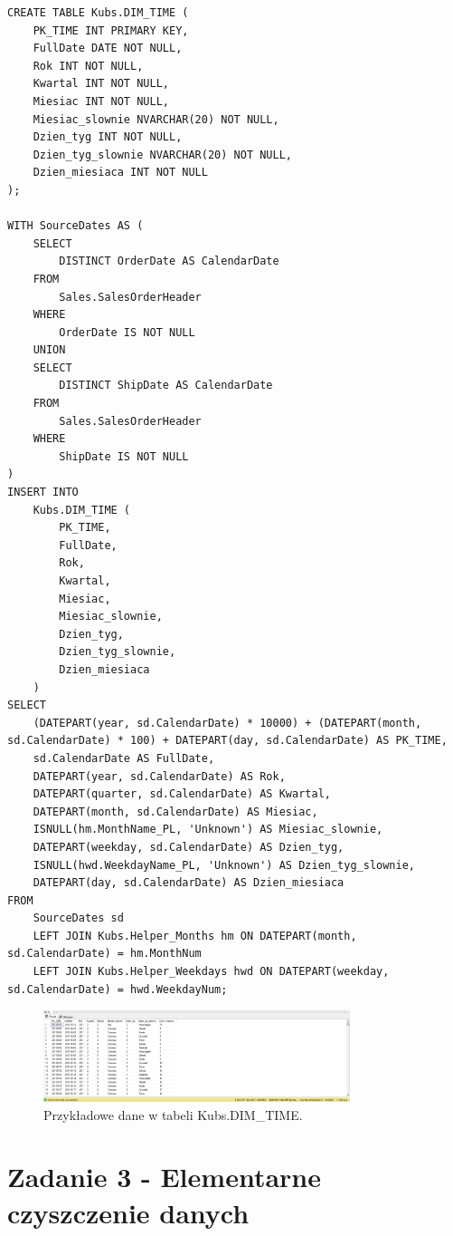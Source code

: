 \documentclass[a4paper,12pt]{article}
\begin{document}
\begin{lstlisting}[caption={Tworzenie i wypełnianie tabeli DIM\_TIME.}, label=lst:zad2_dim_time]
CREATE TABLE Kubs.DIM_TIME (
    PK_TIME INT PRIMARY KEY,
    FullDate DATE NOT NULL,
    Rok INT NOT NULL,
    Kwartal INT NOT NULL,
    Miesiac INT NOT NULL,
    Miesiac_slownie NVARCHAR(20) NOT NULL,
    Dzien_tyg INT NOT NULL,
    Dzien_tyg_slownie NVARCHAR(20) NOT NULL,
    Dzien_miesiaca INT NOT NULL
);

WITH SourceDates AS (
    SELECT
        DISTINCT OrderDate AS CalendarDate
    FROM
        Sales.SalesOrderHeader
    WHERE
        OrderDate IS NOT NULL
    UNION
    SELECT
        DISTINCT ShipDate AS CalendarDate
    FROM
        Sales.SalesOrderHeader
    WHERE
        ShipDate IS NOT NULL
)
INSERT INTO
    Kubs.DIM_TIME (
        PK_TIME,
        FullDate,
        Rok,
        Kwartal,
        Miesiac,
        Miesiac_slownie,
        Dzien_tyg,
        Dzien_tyg_slownie,
        Dzien_miesiaca
    )
SELECT
    (DATEPART(year, sd.CalendarDate) * 10000) + (DATEPART(month, sd.CalendarDate) * 100) + DATEPART(day, sd.CalendarDate) AS PK_TIME,
    sd.CalendarDate AS FullDate,
    DATEPART(year, sd.CalendarDate) AS Rok,
    DATEPART(quarter, sd.CalendarDate) AS Kwartal,
    DATEPART(month, sd.CalendarDate) AS Miesiac,
    ISNULL(hm.MonthName_PL, 'Unknown') AS Miesiac_slownie,
    DATEPART(weekday, sd.CalendarDate) AS Dzien_tyg,
    ISNULL(hwd.WeekdayName_PL, 'Unknown') AS Dzien_tyg_slownie,
    DATEPART(day, sd.CalendarDate) AS Dzien_miesiaca
FROM
    SourceDates sd
    LEFT JOIN Kubs.Helper_Months hm ON DATEPART(month, sd.CalendarDate) = hm.MonthNum
    LEFT JOIN Kubs.Helper_Weekdays hwd ON DATEPART(weekday, sd.CalendarDate) = hwd.WeekdayNum;
\end{lstlisting}

\begin{figure}[H]
    \centering
    \includegraphics[width=0.8\textwidth]{images/2_time_rows.png}
    \caption{Przykładowe dane w tabeli Kubs.DIM\_TIME.}
    \label{fig:dim_time_data}
\end{figure}

\section{Zadanie 3 - Elementarne czyszczenie danych}
\end{document}
